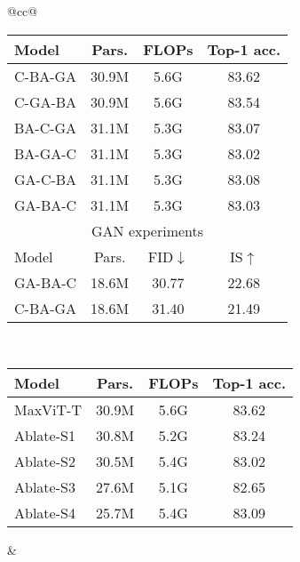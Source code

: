 \documentclass[runningheads]{llncs}
\begin{document}
\begin{table*}[!t]
\begin{tabular}{@{}cc@{}}
\begin{minipage}[t]{0.48\textwidth}
\centering
\setlength{\tabcolsep}{3pt}
\renewcommand{\arraystretch}{0.91}
\caption{\textbf{Block order study.} C, BA, GA represent MBConv, block-, and grid-attention respectively.}
\label{tab:ablation-order}
\begin{tabular}{l|ccc}
Model & Pars. & FLOPs & Top-1 acc. \\
\toprule
C-BA-GA & 30.9M & 5.6G & 83.62 \\\hline
C-GA-BA & 30.9M & 5.6G & 83.54\scriptsize\color{gray}{(-0.08)} \\
BA-C-GA & 31.1M & 5.3G & 83.07\scriptsize\color{gray}{(-0.55)} \\
BA-GA-C & 31.1M & 5.3G & 83.02\scriptsize\color{gray}{(-0.60)} \\
GA-C-BA & 31.1M & 5.3G & 83.08\scriptsize\color{gray}{(-0.54)} \\
GA-BA-C & 31.1M & 5.3G & 83.03\scriptsize\color{gray}{(-0.59)} \\
\midrule
\multicolumn{4}{c}{GAN experiments} \\
Model & Pars. & FID$\downarrow$ & IS$\uparrow$ \\ \toprule
GA-BA-C & 18.6M & 30.77 & 22.68 \\ \hline
C-BA-GA & 18.6M & 31.40 & 21.49\scriptsize\color{gray}{(-1.19)}
\end{tabular}
\end{minipage}
\\
\begin{minipage}[t]{0.48\textwidth}
\centering
\setlength{\tabcolsep}{3pt}
\renewcommand{\arraystretch}{1.}
\caption{\textbf{Ablation of MBConv.} Ablate-S1 means we delete MBConv layers in stage 1. Note that the network will also be smaller if we ablate MBConv layers in some stage.}
\label{tab:ablation-mbconv}
\begin{tabular}{l|ccc}
Model & Pars. & FLOPs & Top-1 acc. \\
\toprule
MaxViT-T & 30.9M & 5.6G & 83.62 \\\hline
Ablate-S1 & 30.8M & 5.2G & 83.24\scriptsize\color{gray}{(-0.38)} \\
Ablate-S2 & 30.5M & 5.4G & 83.02\scriptsize\color{gray}{(-0.60)} \\
Ablate-S3 & 27.6M & 5.1G & 82.65\scriptsize\color{gray}{(-0.97)} \\
Ablate-S4 & 25.7M & 5.4G & 83.09\scriptsize\color{gray}{(-0.53)} \\
\end{tabular}
\end{minipage}&



\end{tabular}
\end{table*}
\end{document}
